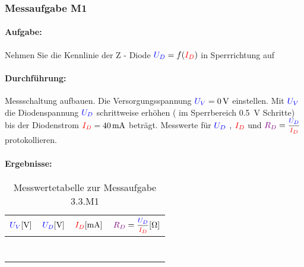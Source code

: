 \documentclass[11pt,a4paper,titlepage,parskip=half]{scrreprt}
\begin{document}
            \subsubsection{Messaufgabe M1}
              \paragraph{Aufgabe:} Nehmen Sie die Kennlinie der Z - Diode $\textcolor{blue}{U_D} = f(\textcolor{red}{I_D})$ in Sperrrichtung auf
              \paragraph{Durchführung:}  Messschaltung aufbauen. Die Versorgungsspannung $\textcolor{blue}{U_V} = \SI{0}{\volt}$ einstellen. Mit $\textcolor{blue}{U_V}$ die Diodenspannung $\textcolor{blue}{U_D}$ schrittweise erhöhen ( im Sperrbereich \SI{0,5}{\volt} Schritte) bis der Diodenstrom $\textcolor{red}{I_D} = \SI{40}{\milli\ampere}$ beträgt. Messwerte für $\textcolor{blue}{U_D}$ , $\textcolor{red}{I_D}$ und $\widerstand{R_D} = \mfrac{\spannung{U_D}}{\strom{I_D}}$ protokollieren.
              \paragraph{Ergebnisse:}
                  \begin{center}
                      \begin{table}[!hbtp]
                          \caption{Messwertetabelle zur Messaufgabe 3.3.M1}
                          \label{tbl:messergebnisse3.3}
                          \renewcommand{\arraystretch}{1.3}
                          \begin{center}

                              \begin{tabular}{c|c|c|c}
                                  $\textcolor{blue}{U_V} [\si{\volt}]$ &
                                  $\textcolor{blue}{U_D}[\si{\volt}]$ &
                                  $\textcolor{red}{I_D} [\si{\milli\ampere}]$ &
                                  $\widerstand{R_D} = \mfrac{\spannung{U_D}}{\strom{I_D}} [\si{\ohm}]$ \\ \hline

                                   &  &  & \\\hline
                                   &  &  & \\\hline
                                   &  &  &\\\hline
                                   &  &  & \\\hline
                                   &  & & \\\hline
                                   &  &  & \\\hline
                                   &  &  & \\
                              \end{tabular}
                          \end{center}
                      \end{table}
                  \end{center}
\end{document}
